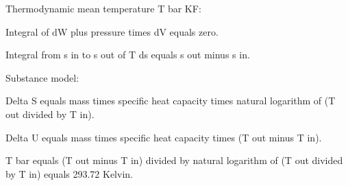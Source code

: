 Thermodynamic mean temperature T bar KF:  

Integral of dW plus pressure times dV equals zero.  

Integral from s in to s out of T ds equals s out minus s in.  

Substance model:  

Delta S equals mass times specific heat capacity times natural logarithm of (T out divided by T in).  

Delta U equals mass times specific heat capacity times (T out minus T in).  

T bar equals (T out minus T in) divided by natural logarithm of (T out divided by T in) equals 293.72 Kelvin.